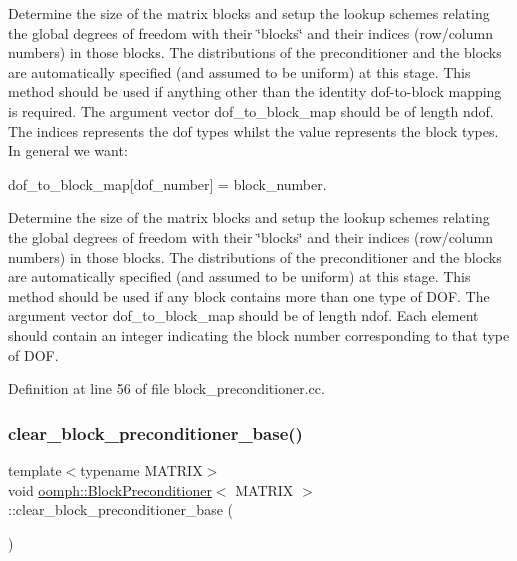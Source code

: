 Determine the size of the matrix blocks and setup the lookup schemes relating the global degrees of freedom with their \char`\"{}blocks\char`\"{} and their indices (row/column numbers) in those blocks. The distributions of the preconditioner and the blocks are automatically specified (and assumed to be uniform) at this stage. This method should be used if anything other than the identity dof-\/to-\/block mapping is required. The argument vector dof\+\_\+to\+\_\+block\+\_\+map should be of length ndof. The indices represents the dof types whilst the value represents the block types. In general we want\+: 

dof\+\_\+to\+\_\+block\+\_\+map\mbox{[}dof\+\_\+number\mbox{]} = block\+\_\+number.

Determine the size of the matrix blocks and setup the lookup schemes relating the global degrees of freedom with their \char`\"{}blocks\char`\"{} and their indices (row/column numbers) in those blocks. The distributions of the preconditioner and the blocks are automatically specified (and assumed to be uniform) at this stage. This method should be used if any block contains more than one type of D\+OF. The argument vector dof\+\_\+to\+\_\+block\+\_\+map should be of length ndof. Each element should contain an integer indicating the block number corresponding to that type of D\+OF. 

Definition at line 56 of file block\+\_\+preconditioner.\+cc.

\mbox{\label{classoomph_1_1BlockPreconditioner_a7845d9301918e3f5cbecd729ec1e309b}} 
\subsubsection{\texorpdfstring{clear\+\_\+block\+\_\+preconditioner\+\_\+base()}{clear\_block\_preconditioner\_base()}}
{\footnotesize\ttfamily template$<$typename M\+A\+T\+R\+IX$>$ \\
void \hyperlink{classoomph_1_1BlockPreconditioner}{oomph\+::\+Block\+Preconditioner}$<$ M\+A\+T\+R\+IX $>$\+::clear\+\_\+block\+\_\+preconditioner\+\_\+base (\begin{DoxyParamCaption}{ }\end{DoxyParamCaption})\hspace{0.3cm}{\ttfamily [inline]}}



